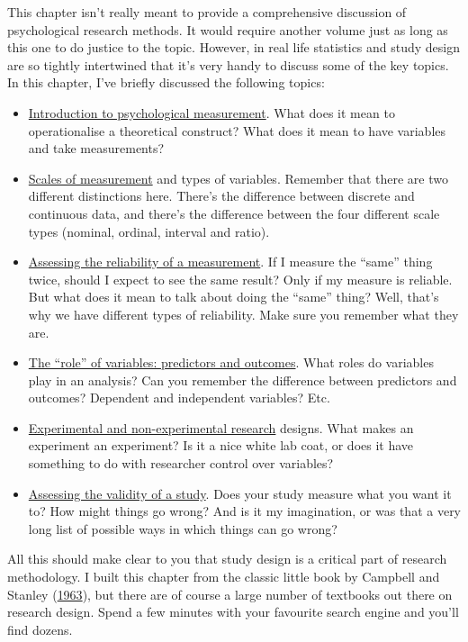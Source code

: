 \documentclass[
]{book}
\providecommand{\tightlist}{%
  \setlength{\itemsep}{0pt}\setlength{\parskip}{0pt}}
\begin{document}
This chapter isn't really meant to provide a comprehensive discussion of psychological research methods. It would require another volume just as long as this one to do justice to the topic. However, in real life statistics and study design are so tightly intertwined that it's very handy to discuss some of the key topics. In this chapter, I've briefly discussed the following topics:

\begin{itemize}
\tightlist
\item
  \protect\hyperlink{introduction-to-psychological-measurement}{Introduction to psychological measurement}. What does it mean to operationalise a theoretical construct? What does it mean to have variables and take measurements?
\item
  \protect\hyperlink{scales-of-measurement}{Scales of measurement} and types of variables. Remember that there are two different distinctions here. There's the difference between discrete and continuous data, and there's the difference between the four different scale types (nominal, ordinal, interval and ratio).
\item
  \protect\hyperlink{assessing-the-reliability-of-a-measurement}{Assessing the reliability of a measurement}. If I measure the ``same'' thing twice, should I expect to see the same result? Only if my measure is reliable. But what does it mean to talk about doing the ``same'' thing? Well, that's why we have different types of reliability. Make sure you remember what they are.
\item
  \protect\hyperlink{the-role-of-variables-predictors-and-outcomes}{The ``role'' of variables: predictors and outcomes}. What roles do variables play in an analysis? Can you remember the difference between predictors and outcomes? Dependent and independent variables? Etc.
\item
  \protect\hyperlink{experimental-and-non-experimental-research}{Experimental and non-experimental research} designs. What makes an experiment an experiment? Is it a nice white lab coat, or does it have something to do with researcher control over variables?
\item
  \protect\hyperlink{assessing-the-validity-of-a-study}{Assessing the validity of a study}. Does your study measure what you want it to? How might things go wrong? And is it my imagination, or was that a very long list of possible ways in which things can go wrong?
\end{itemize}

All this should make clear to you that study design is a critical part of research methodology. I built this chapter from the classic little book by Campbell and Stanley (\protect\hyperlink{ref-Campbell1963}{1963}), but there are of course a large number of textbooks out there on research design. Spend a few minutes with your favourite search engine and you'll find dozens.
\end{document}
